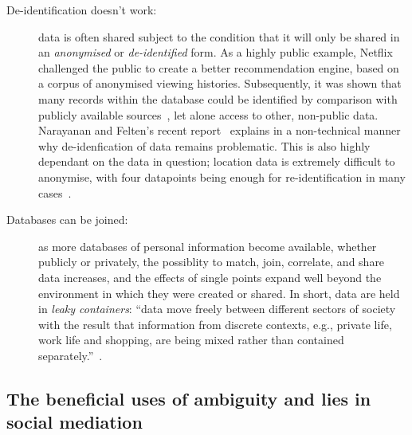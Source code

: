 \documentclass{IOS-Book-Article}     %
\newcommand{\tbox}[3][red]{{
\color{#1}\noindent{
   \fbox{\scriptsize{ {\bf #2} \textsl{#3}}}
   \vspace{2pt}
}
}}
\newcommand{\todo}[1]{\tbox{TODO:}{#1}}
\begin{document}
\begin{description}
\item[De-identification doesn't work:] data is often shared subject to the
condition that it will only be shared in an \emph{anonymised} or
\emph{de-identified} form. As a highly public example, Netflix challenged the
public to create a better recommendation engine, based on a corpus of anonymised
viewing histories. Subsequently, it was shown that many records within the
database could be identified by comparison with publicly available
sources~\cite{narayanan2008Deanon}, let alone access to other, non-public data.
Narayanan and Felten's recent report~\cite{narayanan2014Deidentification} explains in a non-technical manner why
de-idenfication of data remains problematic. This is also highly dependant on
the data in question; location data is extremely difficult to anonymise, with
four datapoints being enough for re-identification in many cases~\cite{montjoye2013Unique}.

\item[Databases can be joined:] as more databases of personal information
become available, whether publicly or privately, the possiblity to match, join,
correlate, and share data increases, and the effects of single points expand well
beyond the environment in which they were created or shared. In short, data are
held in \emph{leaky containers}: ``data move freely between different sectors of
society with the result that information from discrete contexts, e.g.,
 private life, work life and shopping, are being mixed rather than contained 
 separately.''~\cite[p.37--44]{lyon2001surveillance}.
\end{description}



\subsection{The beneficial uses of ambiguity and lies in social mediation}
\end{document}
